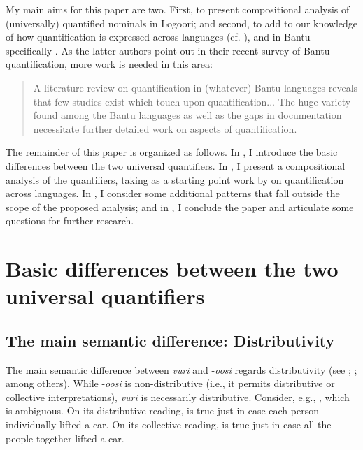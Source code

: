 \documentclass[output=paper]{langsci/langscibook}
\begin{document}
My main aims for this paper are two. First, to present compositional analysis of (universally) quantified nominals in Logoori; and second, to add to our knowledge of how quantification is expressed across languages (cf. \citealt{Matthewson2013}), and in Bantu specifically \citep{ZerbianKrifka2008}. As the latter authors point out in their recent survey of Bantu quantification, more work is needed in this area:

\begin{quote}
A literature review on quantification in (whatever) Bantu languages reveals that few studies exist which touch upon quantification... The huge variety found among the Bantu languages as well as the gaps in documentation necessitate further detailed work on aspects of quantification. \citep[383, 412]{ZerbianKrifka2008}
\end{quote}

The remainder of this paper is organized as follows. In , I introduce the basic differences between the two universal quantifiers. In , I present a compositional analysis of the quantifiers, taking as a starting point work by \citet{Matthewson2013} on quantification across languages. In , I consider some additional patterns that fall outside the scope of the proposed analysis; and in , I conclude the paper and articulate some questions for further research.

\section{Basic differences between the two universal quantifiers}\label{sec:landman:2}
\subsection{The main semantic difference: Distributivity} 

The main semantic difference between \textit{vuri} and -\textit{oosi} regards distributivity (see \citealt{Gil1995}; \citealt{Vendler1962}; among others). While -\textit{oosi} is non-distributive (i.e., it permits distributive or collective interpretations), \textit{vuri} is necessarily distributive. Consider, e.g., , which is ambiguous. On its distributive reading,  is true just in case each person individually lifted a car. On its collective reading,  is true just in case all the people together lifted a car.
\end{document}
